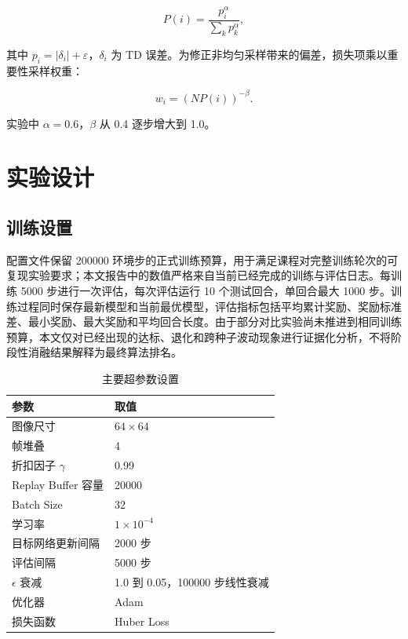 \documentclass[UTF8,a4paper,12pt]{ctexart}
\begin{document}
\begin{equation}
P(i)=\frac{p_i^\alpha}{\sum_k p_k^\alpha},
\end{equation}

其中 $p_i=|\delta_i|+\varepsilon$，$\delta_i$ 为 TD 误差。为修正非均匀采样带来的偏差，损失项乘以重要性采样权重：

\begin{equation}
w_i=\left(NP(i)\right)^{-\beta}.
\end{equation}

实验中 $\alpha=0.6$，$\beta$ 从 0.4 逐步增大到 1.0。

\section{实验设计}

\subsection{训练设置}

配置文件保留 200000 环境步的正式训练预算，用于满足课程对完整训练轮次的可复现实验要求；本文报告中的数值严格来自当前已经完成的训练与评估日志。每训练 5000 步进行一次评估，每次评估运行 10 个测试回合，单回合最大 1000 步。训练过程同时保存最新模型和当前最优模型，评估指标包括平均累计奖励、奖励标准差、最小奖励、最大奖励和平均回合长度。由于部分对比实验尚未推进到相同训练预算，本文仅对已经出现的达标、退化和跨种子波动现象进行证据化分析，不将阶段性消融结果解释为最终算法排名。

\begin{table}[htbp]
\centering
\caption{主要超参数设置}
\begin{tabular}{ll}
\toprule
参数 & 取值 \\
\midrule
图像尺寸 & $64 \times 64$ \\
帧堆叠 & 4 \\
折扣因子 $\gamma$ & 0.99 \\
Replay Buffer 容量 & 20000 \\
Batch Size & 32 \\
学习率 & $1\times10^{-4}$ \\
目标网络更新间隔 & 2000 步 \\
评估间隔 & 5000 步 \\
$\epsilon$ 衰减 & 1.0 到 0.05，100000 步线性衰减 \\
优化器 & Adam \\
损失函数 & Huber Loss \\
\bottomrule
\end{tabular}
\end{table}
\end{document}
